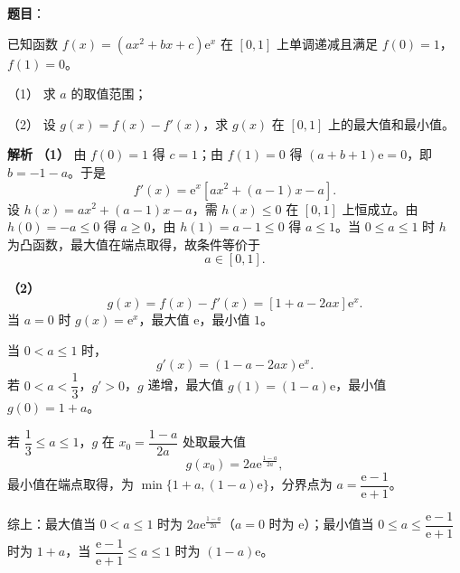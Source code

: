 \begin{answer}

\textbf{题目}：

已知函数 $f(x)=(ax^2+bx+c)\mathrm e^x$ 在 $[0,1]$ 上单调递减且满足 $f(0)=1$，$f(1)=0$。

（1） 求 $a$ 的取值范围；

（2） 设 $g(x)=f(x)-f'(x)$，求 $g(x)$ 在 $[0,1]$ 上的最大值和最小值。

\textbf{解析}
\textbf{（1）} 由 $f(0)=1$ 得 $c=1$；由 $f(1)=0$ 得 $(a+b+1)\mathrm e=0$，即 $b=-1-a$。于是
\nopagebreak[4]
\[f'(x)=\mathrm e^x\left[ax^2+(a-1)x-a\right].\]
设 $h(x)=ax^2+(a-1)x-a$，需 $h(x)\leqslant0$ 在 $[0,1]$ 上恒成立。由 $h(0)=-a\leqslant0$ 得 $a\geqslant0$，由 $h(1)=a-1\leqslant0$ 得 $a\leqslant1$。当 $0\leqslant a\leqslant1$ 时 $h$ 为凸函数，最大值在端点取得，故条件等价于
\nopagebreak[4]
\[a\in[0,1].\]

\textbf{（2）}
\nopagebreak[4]
\[g(x)=f(x)-f'(x)=\left[1+a-2ax\right]\mathrm e^x.\]
当 $a=0$ 时 $g(x)=\mathrm e^x$，最大值 $\mathrm e$，最小值 $1$。

当 $0<a\leqslant1$ 时，
\nopagebreak[4]
\[g'(x)=(1-a-2ax)\mathrm e^x.\]
若 $0<a<\dfrac13$，$g'>0$，$g$ 递增，最大值 $g(1)=(1-a)\mathrm e$，最小值 $g(0)=1+a$。

若 $\dfrac13\leqslant a\leqslant1$，$g$ 在 $x_0=\dfrac{1-a}{2a}$ 处取最大值
\nopagebreak[4]
\[g(x_0)=2a\mathrm e^{\frac{1-a}{2a}},\]
最小值在端点取得，为 $\min\{1+a,(1-a)\mathrm e\}$，分界点为 $a=\dfrac{\mathrm e-1}{\mathrm e+1}$。

综上：最大值当 $0<a\leqslant1$ 时为 $2a\mathrm e^{\frac{1-a}{2a}}$（$a=0$ 时为 $\mathrm e$）；最小值当 $0\leqslant a\leqslant\dfrac{\mathrm e-1}{\mathrm e+1}$ 时为 $1+a$，当 $\dfrac{\mathrm e-1}{\mathrm e+1}\leqslant a\leqslant1$ 时为 $(1-a)\mathrm e$。



\end{answer}